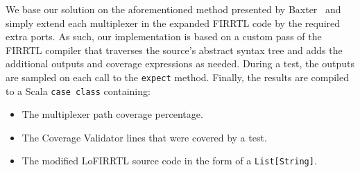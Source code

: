 \documentclass[conference]{IEEEtran}
\newcommand{\martin}[1]{{\color{blue} Martin: #1}}
\begin{document}
We base our solution on the aforementioned method presented by Baxter~\cite{branch-cov-made-easy:2002} and simply extend each multiplexer in the expanded FIRRTL code by the required extra ports. %
As such, our implementation is based on a custom pass of the FIRRTL compiler that traverses the source's abstract syntax tree and adds the additional outputs and coverage expressions as needed. During a test, the outputs are sampled on each call to the \texttt{expect} method. Finally, the results are compiled to a Scala \texttt{case class} containing:%
\begin{itemize}
\item The multiplexer path coverage percentage.
\item The Coverage Validator lines that were covered by a test.
\item The modified LoFIRRTL source code in the form of a \texttt{List[String]}.
\end{itemize}
\end{document}
